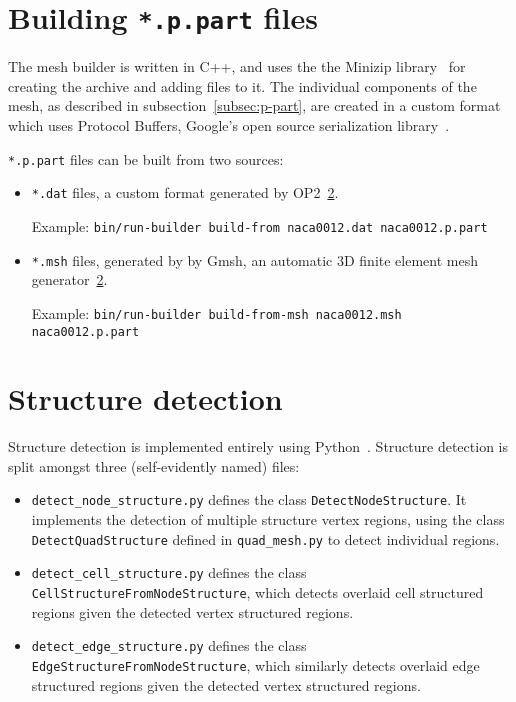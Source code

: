 \section{Building \texttt{*.p.part} files}
The mesh builder is written in C++, and uses the the Minizip library~\cite{minizip} for creating the archive and adding files to it. The individual components of the mesh, as described in subsection~\ref{subsec:p-part}, are created in a custom format which uses Protocol Buffers, Google's open source serialization library~\cite{protocolbuffers}.

\texttt{*.p.part} files can be built from two sources:
\begin{itemize}
\item \texttt{*.dat} files, a custom format generated by OP2~\ref{}.

Example: \texttt{bin/run-builder build-from naca0012.dat naca0012.p.part}
\item \texttt{*.msh} files, generated by by Gmsh, an automatic 3D finite element mesh generator~\ref{}.

Example: \texttt{bin/run-builder build-from-msh naca0012.msh naca0012.p.part}
\end{itemize}


\section{Structure detection}
Structure detection is implemented entirely using Python~\cite{python}. Structure detection is split amongst three (self-evidently named) files:
\begin{itemize}
\item \texttt{detect\_node\_structure.py} defines the class \lstinline|DetectNodeStructure|. It implements the detection of multiple structure vertex regions, using the class \lstinline|DetectQuadStructure| defined in \texttt{quad\_mesh.py} to detect individual regions.
\item \texttt{detect\_cell\_structure.py} defines the class \lstinline|CellStructureFromNodeStructure|, which detects overlaid cell structured regions given the detected vertex structured regions.
\item \texttt{detect\_edge\_structure.py} defines the class \lstinline|EdgeStructureFromNodeStructure|, which similarly detects overlaid edge structured regions given the detected vertex structured regions.
\end{itemize}

